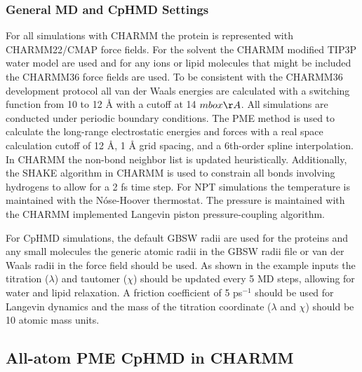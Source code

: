 \documentclass[9pt,tutorial]{livecoms}
\begin{document}
\subsubsection{General MD and CpHMD Settings}

For all simulations with CHARMM the protein is represented with CHARMM22/CMAP force fields.\cite{MacKerell_JPhysChemB_1998_v102_p3586,MacKerell_JComputChem_2004_v25_p1400}
For the solvent the CHARMM modified TIP3P water model are used and for any ions or lipid molecules that might be included the CHARMM36 force fields are used.\cite{Klauda_JPhysChemB_2010_v114_p7830}
To be consistent with the CHARMM36 development protocol all van der Waals energies are calculated with a switching function from 10 to 12 $\mbox{\AA}$ with a cutoff at 14 $mbox{\AA}$. 
All simulations are conducted under periodic boundary conditions. 
The PME method\cite{Darden_JChemPhys_1993_v98_p10089} is used to calculate the long-range electrostatic energies and forces with a real space calculation cutoff of 12 $\mbox{\AA}$, 1 $\mbox{\AA}$ grid spacing, and a 6th-order spline interpolation. 
In CHARMM the non-bond neighbor list is updated heuristically. 
Additionally, the SHAKE\cite{Ryckaert_JComputPhys_1977_v23_p327} algorithm in CHARMM is used to constrain all bonds involving hydrogens to allow for a 2 fs time step. 
For NPT simulations the temperature is maintained with the N\'{o}se-Hoover thermostat.\cite{Nose_MolPhys_1984_v52_p255, Hoover_PhysRevA_1985_v31_p1695}
The pressure is maintained with the CHARMM implemented Langevin piston pressure-coupling algorithm.\cite{Feller_JChemPhys_1995_v103_p4613}

For CpHMD simulations, the default GBSW radii\cite{Nina_JPhysChemB_1997_v101_p5239, Chen_JAmChemSoc_2006_v128_p3728} are used for the proteins and any small molecules the generic atomic radii in the GBSW radii file or van der Waals radii in the force field\cite{Knight_JComputChem_2011_v32_p2909} should be used. 
As shown in the example inputs the titration ($\lambda$) and tautomer ($\chi$) should be updated every 5 MD steps, allowing for water and lipid relaxation.\cite{Wallace_JChemTheoryComput_2011_v7_p2617}
A friction coefficient of 5 ps$^{-1}$ should be used for Langevin dynamics and the mass of the titration coordinate ($\lambda$ and $\chi$) should be 10 atomic mass units. 

\subsection{All-atom PME CpHMD in CHARMM} %
\end{document}
